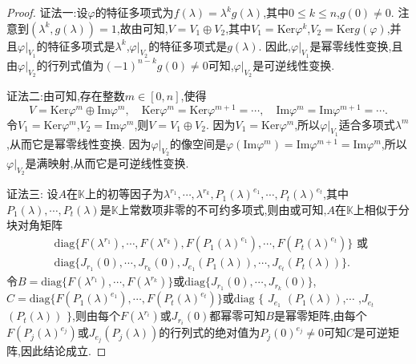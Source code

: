 \documentclass[../../main.tex]{subfiles}
\begin{document}
\begin{proof}
{\color{blue}证法一:}设$\varphi$的特征多项式为$f(\lambda)=\lambda^kg(\lambda)$,其中$0\leqslant k\leqslant n$,$g(0)\neq 0$. 注意到$(\lambda^k,g(\lambda)) = 1$,故由可知,$V = V_1\oplus V_2$,其中$V_1=\mathrm{Ker}\varphi^k$,$V_2=\mathrm{Ker}g(\varphi)$,并且$\varphi|_{V_1}$的特征多项式是$\lambda^k$,$\varphi|_{V_2}$的特征多项式是$g(\lambda)$. 因此,$\varphi|_{V_1}$是幂零线性变换,且由$\varphi|_{V_2}$的行列式值为$(-1)^{n - k}g(0)\neq 0$可知,$\varphi|_{V_2}$是可逆线性变换.

{\color{blue}证法二:}由可知,存在整数$m\in[0,n]$,使得
\[V=\mathrm{Ker}\varphi^m\oplus\mathrm{Im}\varphi^m,\quad \mathrm{Ker}\varphi^m=\mathrm{Ker}\varphi^{m + 1}=\cdots,\quad \mathrm{Im}\varphi^m=\mathrm{Im}\varphi^{m + 1}=\cdots.\]
令$V_1=\mathrm{Ker}\varphi^m$,$V_2=\mathrm{Im}\varphi^m$,则$V = V_1\oplus V_2$. 因为$V_1=\mathrm{Ker}\varphi^m$,所以$\varphi|_{V_1}$适合多项式$\lambda^m$,从而它是幂零线性变换. 因为$\varphi|_{V_2}$的像空间是$\varphi(\mathrm{Im}\varphi^m)=\mathrm{Im}\varphi^{m + 1}=\mathrm{Im}\varphi^m$,所以$\varphi|_{V_2}$是满映射,从而它是可逆线性变换. 

{\color{blue}证法三:}
设$A$在$\mathbb{K}$上的初等因子为$\lambda^{r_1},\cdots,\lambda^{r_k},P_1(\lambda)^{e_1},\cdots,P_t(\lambda)^{e_t}$,其中$P_1(\lambda),\cdots,P_t(\lambda)$是$\mathbb{K}$上常数项非零的不可约多项式,则由或可知,$A$在$\mathbb{K}$上相似于分块对角矩阵
\begin{align*}
&\mathrm{diag}\{F(\lambda^{r_1}),\cdots,F(\lambda^{r_k}),F(P_1(\lambda)^{e_1}),\cdots,F(P_t(\lambda)^{e_t})\}\text{ 或 }\\
&\mathrm{diag}\{J_{r_1}(0),\cdots,J_{r_k}(0),J_{e_1}(P_1(\lambda)),\cdots,J_{e_t}(P_t(\lambda))\}.
\end{align*}
令$B = \mathrm{diag}\{F(\lambda^{r_1}),\cdots,F(\lambda^{r_k})\}$或$\mathrm{diag}\{J_{r_1}(0),\cdots,J_{r_k}(0)\}$,$C = \mathrm{diag}\{F(P_1(\lambda)^{e_1}),\cdots,F(P_t(\lambda)^{e_t})\}$或$\mathrm{diag}$ $\{$ $J_{e_1}$ $(P_1(\lambda))$,$\cdots$ ,$J_{e_t}$ $(P_t(\lambda))$ $\}$,则由每个$F(\lambda^{r_i})$或$J_{r_i}(0)$都幂零可知$B$是幂零矩阵,由每个$F(P_j(\lambda)^{e_j})$或$J_{e_j}(P_j(\lambda))$的行列式的绝对值为$P_j(0)^{e_j}\neq 0$可知$C$是可逆矩阵,因此结论成立.

\end{proof}
\end{document}
